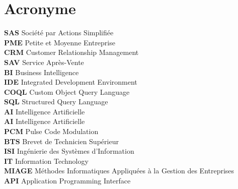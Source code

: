 \section*{Acronyme}

\begin{small}
    \noindent \vspace{0.3cm}
    \textbf{SAS} Société par Actions Simplifiée \\\vspace{0.3cm}
    \textbf{PME} Petite et Moyenne Entreprise \\\vspace{0.3cm}
    \textbf{CRM} Customer Relationship Management \\\vspace{0.3cm}
    \textbf{SAV} Service Après-Vente \\\vspace{0.3cm}
    \textbf{BI} Business Intelligence \\\vspace{0.3cm}
    \textbf{IDE} Integrated Development Environment \\\vspace{0.3cm}
     \textbf{COQL} Custom Object Query Language \\\vspace{0.3cm}
     \textbf{SQL} Structured Query Language  \\\vspace{0.3cm}
     \textbf{AI} Intelligence Artificielle  \\\vspace{0.3cm}
     \textbf{AI} Intelligence Artificielle  \\\vspace{0.3cm}
     \textbf{PCM} Pulse Code Modulation  \\\vspace{0.3cm}
     \textbf{BTS} Brevet de Technicien Supérieur  \\\vspace{0.3cm}
     \textbf{ISI} Ingénierie des Systèmes d’Information \\\vspace{0.3cm}
     \textbf{IT} Information Technology  \\\vspace{0.3cm}
     \textbf{MIAGE} Méthodes Informatiques Appliquées à la Gestion des Entreprises  \\\vspace{0.3cm}
     \textbf{API} Application Programming Interface\\\vspace{0.3cm}


\end{small}
